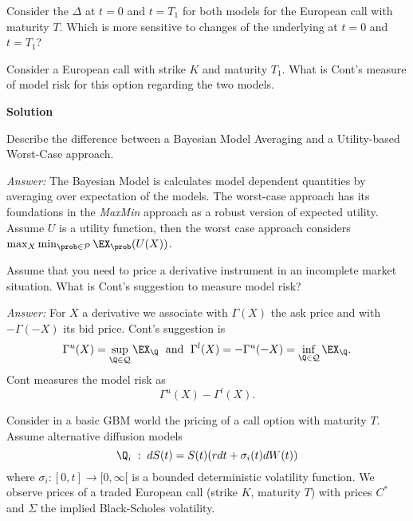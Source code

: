 \documentclass[11pt,a4paper,titlepage]{article}
\begin{document}
	
Consider the $\Delta$ at $t=0$ and $t=T_1$ for both models for the European call with maturity $T$. Which is more sensitive to changes of the underlying at $t=0$ and $t=T_1$?


	
Consider  a  European call with strike $K$ and maturity $T_1$. What is Cont's measure of model risk for this option regarding the two models.













	{\bf Solution}








	
Describe the difference between a Bayesian Model Averaging and a Utility-based Worst-Case
approach.

{\it Answer:} The Bayesian Model is calculates model dependent quantities by averaging over  expectation of the models. The worst-case approach has its foundations in the {\it MaxMin} approach as a robust version of expected utility. Assume $U$ is a utility function, then
the worst case approach considers
$\max _X \min_{\prob \in {\cal P}} \EX_{\prob}(U(X))$.



	Assume that you need to price a derivative instrument in an incomplete market situation. What is Cont's suggestion to measure model risk?

{\it Answer:}
For $X$ a derivative we associate with
$\Gamma(X)$ the ask price and with $-\Gamma(-X)$ its bid price.
Cont's suggestion is
$$
\Gamma^u(X)=\sup_{\Q \in {\cal Q}} \EX_{\Q} \; \mbox{ and } \;
\Gamma^l(X)= -\Gamma^u(-X)=\inf_{\Q \in {\cal Q}} \EX_{\Q}.
$$
Cont measures the model risk as
$$
\Gamma^u(X)-
\Gamma^l(X).
$$



	
Consider in a basic GBM world the pricing of a call option with maturity $T$.
Assume alternative diffusion models
\begin{equation}
\Q_i\;:\; dS(t) = S(t)(r dt + \sigma_i(t) dW(t))
\end{equation}
where $ \sigma_i: [0,t] \rightarrow [0, \infty[ $ is a bounded deterministic volatility function.
We observe prices of a traded European call (strike $K$, maturity $T$) with prices $C^*$ and
$\Sigma$ the implied Black-Scholes volatility.
\end{document}
